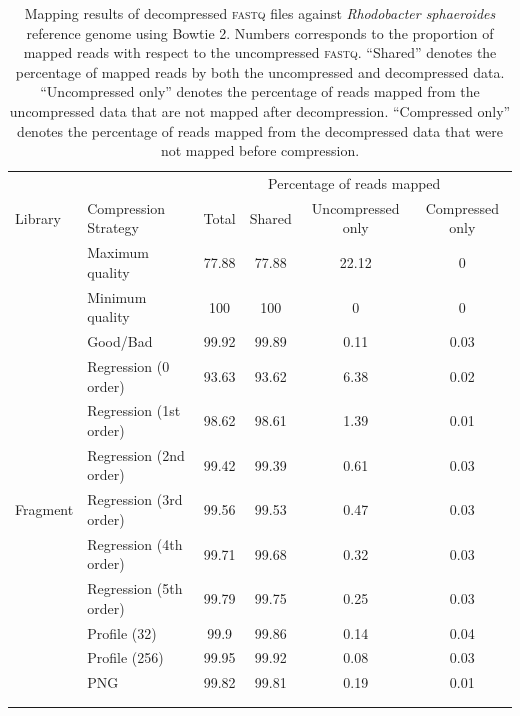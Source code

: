 \documentclass{bioinfo}
\begin{document}
\begin{table}[!tbhp]
\centering
\caption[]{Mapping results of decompressed \textsc{fastq} files against \textit{Rhodobacter sphaeroides} reference genome using Bowtie 2. Numbers corresponds to the proportion of mapped reads with respect to the uncompressed \textsc{fastq}. ``Shared'' denotes the percentage of mapped reads by both the uncompressed and decompressed data. ``Uncompressed only'' denotes the percentage of reads mapped from the uncompressed data that are not mapped after decompression. ``Compressed only'' denotes the percentage of reads mapped from the decompressed data that were not mapped before compression.}
\begin{tabular}{llcccc}
    & & \multicolumn{4}{c}{Percentage of reads mapped}\\
    \cline{3-6}
	Library & Compression Strategy & Total & Shared & Uncompressed only & Compressed only \\ \hline
	& Maximum quality & 77.88 & 77.88 & 22.12 & 0 \\
	&Minimum quality & 100 & 100 & 0 & 0 \\
	&Good/Bad & 99.92 & 99.89 & 0.11 & 0.03 \\
	&Regression (0 order) & 93.63 & 93.62 & 6.38 & 0.02 \\
	&Regression (1st order) & 98.62 & 98.61 & 1.39 & 0.01 \\
	&Regression (2nd order) & 99.42 & 99.39 & 0.61 & 0.03 \\
	Fragment&Regression (3rd order) & 99.56 & 99.53 & 0.47 & 0.03 \\
	&Regression (4th order) & 99.71 & 99.68 & 0.32 & 0.03 \\ 
	&Regression (5th order) & 99.79 & 99.75 & 0.25 & 0.03 \\
	&Profile (32) & 99.9 & 99.86 & 0.14 & 0.04 \\ 
	&Profile (256) & 99.95 & 99.92 & 0.08 & 0.03 \\
	&PNG & 99.82 & 99.81 & 0.19 & 0.01 \\ 

\\ \hline \\


\end{tabular}
\end{table}
\end{document}
